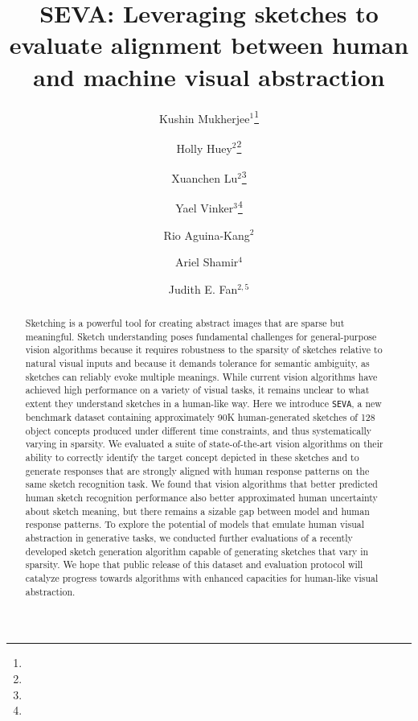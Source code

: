 \documentclass{article}
\title{SEVA: Leveraging sketches to evaluate alignment between human and machine visual abstraction}
\author[ ]{Kushin Mukherjee$^{1}$\footnote[1]{}}
\author[ ]{Holly Huey$^{2}$\footnote[1]{}}
\author[ ]{Xuanchen Lu$^{2}$\footnote[1]{}}
\author[ ]{Yael Vinker$^{3}$\footnote[1]{}}
\author[ ]{Rio Aguina-Kang$^{2}$}
\author[ ]{Ariel Shamir$^{4}$}
\author[ ]{Judith E. Fan$^{2,5}$}
\affil[ ]{University of Wisconsin-Madison$^1$}
\affil[ ]{University of California, San Diego$^2$}
\affil[ ]{Tel-Aviv University$^3$}
\affil[ ]{Reichman University$^4$}
\affil[ ]{Stanford University$^5$}
\begin{document}


\maketitle


\begin{abstract}

Sketching is a powerful tool for creating abstract images that are sparse but meaningful. Sketch understanding poses fundamental challenges for general-purpose vision algorithms because it requires robustness to the sparsity of sketches relative to natural visual inputs and because it demands tolerance for semantic ambiguity, as sketches can reliably evoke multiple meanings. While current vision algorithms have achieved high performance on a variety of visual tasks, it remains unclear to what extent they understand sketches in a human-like way. Here we introduce \texttt{SEVA}, a new benchmark dataset containing approximately 90K human-generated sketches of 128 object concepts produced under different time constraints, and thus systematically varying in sparsity. We evaluated a suite of state-of-the-art vision algorithms on their ability to correctly identify the target concept depicted in these sketches and to generate responses that are strongly aligned with human response patterns on the same sketch recognition task. We found that vision algorithms that better predicted human sketch recognition performance also better approximated human uncertainty about sketch meaning, but there remains a sizable gap between model and human response patterns. To explore the potential of models that emulate human visual abstraction in generative tasks, we conducted further evaluations of a recently developed sketch generation algorithm \cite{vinker2022clipasso} capable of generating sketches that vary in sparsity. We hope that public release of this dataset and evaluation protocol will catalyze progress towards algorithms with enhanced capacities for human-like visual abstraction.
\end{abstract}


\end{document}
